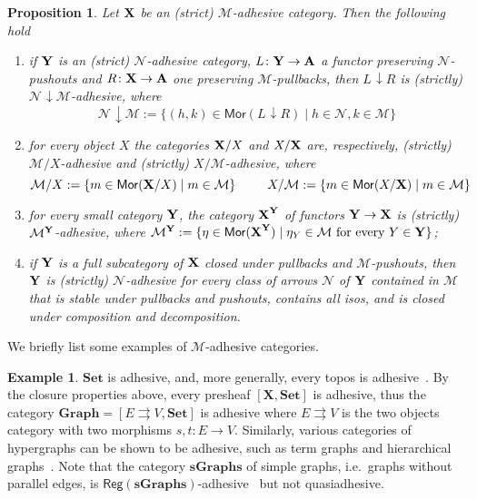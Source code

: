 \documentclass[a4paper,UKenglish,cleveref,pdftex,amsthm,thm-restate,numberwithinsect]{cas-sc}
\newcommand{\cat}[1]{\ensuremath{\mathbf{#1}}}
\theoremstyle{plain}
\newtheorem{proposition}[theorem]{Proposition}
\theoremstyle{definition}
\newtheorem{example}[theorem]{Example}
\def\X{\textbf {\textup{X}}}
\def\Y{\textbf {\textup{Y}}}
\def\A{\textbf {\textup{A}}}
\newcommand{\comm}[2]{#1\hspace{1pt} {\downarrow}#2}
\newcommand{\mor}{\mathsf{Mor}}
\newcommand{\reg}{\mathsf{Reg}}
\begin{document}
\begin{proposition}
	\label{thm:slice-functors}
	Let $\X$ be an (strict) $\mathcal{M}$-adhesive category. Then the following hold
	\begin{enumerate}
		\item if $\Y$ is an (strict) $\mathcal{N}$-adhesive category, $L\colon \Y\to \A$ a functor preserving $\mathcal{N}$-pushouts and $R\colon \X\to \A$ one preserving $\mathcal{M}$-pullbacks, then $\comm{L}{R}$ is (strictly) $\comm{\mathcal{N}}{\mathcal{M}}$-adhesive, where
		\[\comm{\mathcal{N}}{\mathcal{M}}:=\{(h,k) \in \mor(\comm{L}{R}) \mid h\in \mathcal{N}, k\in \mathcal{M}\}\]
		\item for every object $X$
		the categories $\X/X$  and $X/\X$ are, respectively, (strictly) $\mathcal{M}/X$-adhesive and (strictly) $X/\mathcal{M}$-adhesive, where
		\[\mathcal{M}/X:=\{m\in \mor(\X/X) \mid m\in
		\mathcal{M}\} \hspace{25pt} X/\mathcal{M}:=\{m\in \mor(X/\X) \mid m\in \mathcal{M}\}\]
		\item for every small category $\Y$, the category $\X^\Y$ of
		functors $\Y\to \X$ is (strictly) $\mathcal{M}^{\Y}$-adhesive, where
		$\mathcal{M}^{\Y}:=\{\eta \in \mor(\X^\Y) \mid \eta_Y \in
		\mathcal{M} \text{ for every } Y\in \Y\}$;
		\item if $\Y$ is a full subcategory of $\X$ closed under pullbacks and $\mathcal{M}$-pushouts, then $\Y$ is (strictly) $\mathcal{N}$-adhesive for every class of arrows $\mathcal{N}$ of $\Y$ contained in $\mathcal{M}$ that is stable under pullbacks and pushouts, contains all isos, and is closed under composition and decomposition.
	\end{enumerate} 
\end{proposition}

We briefly list some examples of $\mathcal{M}$-adhesive categories.

\begin{example}
	\label{ex:adhesive}
	$\cat{Set}$ is adhesive, and, more generally, every topos is
	adhesive~\cite{lack2006toposes}. By the closure properties above, every presheaf $[\cat{X},\cat{Set}]$ is adhesive, thus the category
	$\cat{Graph} = [ E \rightrightarrows V, \cat{Set}]$ is adhesive
	where $E \rightrightarrows {V}$ is the two objects category with two
	morphisms $s,t \colon{E} \to {V}$. Similarly, various
	categories of hypergraphs can be shown to be adhesive, such as term
	graphs and hierarchical graphs~\cite{CastelnovoGM24}. Note that the category $\cat{sGraphs}$ of simple graphs, 
	i.e.~graphs without parallel edges, is
	$\reg{(\cat{sGraphs})}$-adhesive~\cite{BehrHK23} but not
	quasiadhesive.
\end{example}
\end{document}
